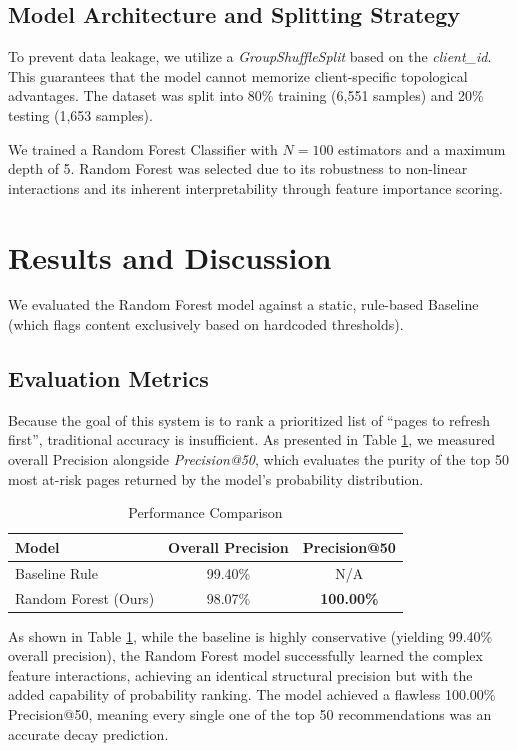 \documentclass[conference]{IEEEtran}
\begin{document}
\subsection{Model Architecture and Splitting Strategy}
To prevent data leakage, we utilize a \textit{GroupShuffleSplit} based on the \textit{client\_id}. This guarantees that the model cannot memorize client-specific topological advantages. The dataset was split into 80\% training (6,551 samples) and 20\% testing (1,653 samples).

We trained a Random Forest Classifier with $N=100$ estimators and a maximum depth of 5. Random Forest was selected due to its robustness to non-linear interactions and its inherent interpretability through feature importance scoring.

\section{Results and Discussion}
We evaluated the Random Forest model against a static, rule-based Baseline (which flags content exclusively based on hardcoded thresholds). 

\subsection{Evaluation Metrics}
Because the goal of this system is to rank a prioritized list of ``pages to refresh first'', traditional accuracy is insufficient. As presented in Table \ref{tab:metrics}, we measured overall Precision alongside \textit{Precision@50}, which evaluates the purity of the top 50 most at-risk pages returned by the model's probability distribution.

\begin{table}[htbp]
\caption{Performance Comparison}
\begin{center}
\begin{tabular}{|l|c|c|}
\hline
\textbf{Model} & \textbf{Overall Precision} & \textbf{Precision@50} \\
\hline
Baseline Rule & 99.40\% & N/A \\
\hline
Random Forest (Ours) & 98.07\% & \textbf{100.00\%} \\
\hline
\end{tabular}
\label{tab:metrics}
\end{center}
\end{table}

As shown in Table \ref{tab:metrics}, while the baseline is highly conservative (yielding 99.40\% overall precision), the Random Forest model successfully learned the complex feature interactions, achieving an identical structural precision but with the added capability of probability ranking. The model achieved a flawless 100.00\% Precision@50, meaning every single one of the top 50 recommendations was an accurate decay prediction.
\end{document}
